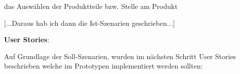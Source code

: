 das Auswählen der Produktteile bzw. Stelle am Produkt 






[...Daraus hab ich dann die Ist-Szenarien geschrieben...]

\textbf{User Stories}:

Auf Grundlage der Soll-Szenarien, wurden im nächsten Schritt User Stories beschrieben welche im Prototypen implementiert werden sollten: 


